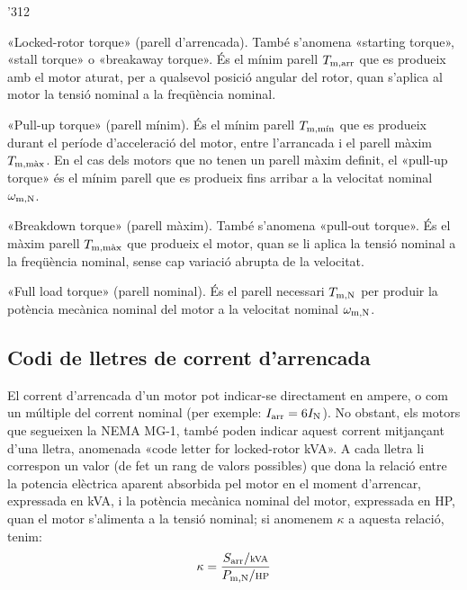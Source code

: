 \begin{dingautolist}{'312}
   \item «Locked-rotor torque» (parell d'arrencada). També s'anomena «starting torque», «stall torque» o «breakaway torque». És el mínim parell $T\ped{m,arr}$ que es produeix amb el motor aturat, per a qualsevol posició angular del rotor, quan s'aplica al motor la tensió nominal a la freqüència nominal.
   \item «Pull-up torque» (parell mínim). És el mínim parell $T\ped{m,\text{mín}}$ que es produeix durant el període d'acceleració del motor, entre l'arrancada  i el parell màxim $T\ped{m,\text{màx}}$. En el cas dels motors que no tenen un parell màxim definit, el «pull-up torque» és el mínim parell que es produeix fins arribar a la velocitat nominal $\omega\ped{m,N}$.
   \item «Breakdown torque» (parell màxim). També s'anomena «pull-out torque». És el màxim parell $T\ped{m,\text{màx}}$ que  produeix  el motor, quan se li aplica  la tensió nominal a la freqüència nominal, sense cap variació abrupta de la velocitat.
   \item «Full load torque» (parell nominal). És el parell necessari $T\ped{m,N}$ per produir la potència mecànica nominal del motor a la velocitat nominal  $\omega\ped{m,N}$.
\end{dingautolist}


\subsection{Codi de lletres de corrent d'arrencada}

El corrent d'arrencada d'un motor pot indicar-se directament en ampere, o com un múltiple del corrent nominal (per exemple: $I\ped{arr} = 6 I\ped{N}$). No obstant, els motors que segueixen la NEMA MG-1, també poden indicar aquest corrent mitjançant d'una lletra, anomenada «code letter for locked-rotor kVA». A cada lletra li correspon un valor (de fet un rang de valors possibles) que dona la relació entre la potencia elèctrica aparent absorbida pel motor en el moment d'arrencar, expressada en kVA, i la potència mecànica nominal del motor, expressada en HP, quan el motor s'alimenta a la tensió nominal; si anomenem $\kappa$ a aquesta relació, tenim:
\begin{equation}
    \kappa = \frac{S\ped{arr}/{\scriptstyle\si{kVA}}}{P\ped{m,N}/{\scriptstyle \si{HP}}}
\end{equation}

